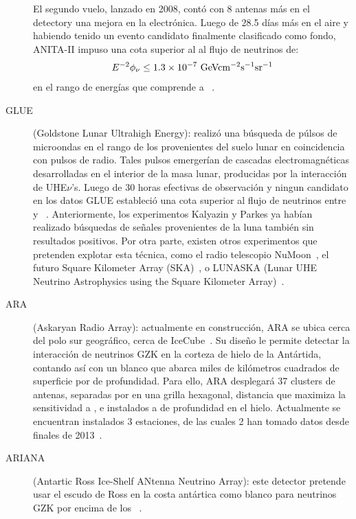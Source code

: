 \begin{description}
	 El segundo vuelo, lanzado en 2008, cont\'o con 8 antenas m\'as en el detectory una mejora en la electr\'onica.
	 Luego de 28.5 d\'ias m\'as en el aire y habiendo tenido un evento candidato finalmente clasificado como fondo, ANITA-II impuso una cota superior al  al flujo de neutrinos de:
	 \begin{equation}
	 E^{-2}\phi_\nu \leq 1.3\times10^{-7}{\rm\ GeVcm^{-2}s^{-1}sr^{-1}}
	 \end{equation}
	 en el rango de energ\'ias que comprende  a ~\cite{cite:Anita2}.
	 \item[GLUE] (Goldstone Lunar Ultrahigh Energy): realiz\'o una b\'usqueda de p\'ulsos de microondas en el rango de los  provenientes del suelo lunar en coincidencia con pulsos de radio. 
	 Tales pulsos emerger\'ian de cascadas electromagn\'eticas desarrolladas en el interior de la masa lunar, producidas por la interacci\'on de UHE$\nu$'s. 
	 Luego de 30 horas efectivas de observaci\'on y ningun candidato en los datos GLUE estableci\'o una cota superior al flujo de neutrinos entre  y ~\cite{cite:Glue}.
	 Anteriormente, los experimentos Kalyazin \cite{cite:Kalazin} y Parkes \cite{cite:Parkes} ya hab\'ian realizado b\'usquedas de se\~nales provenientes de la luna tambi\'en sin resultados positivos.
	 Por otra parte, existen otros experimentos que pretenden explotar esta t\'ecnica, como el radio telescopio NuMoon~\cite{cite:NuMoon}, el futuro Square Kilometer Array (SKA)~\cite{cite:SKA}, o LUNASKA (Lunar UHE Neutrino Astrophysics using the Square Kilometer Array)~\cite{cite:LUNASKA}.
	 \item[ARA] (Askaryan Radio Array): actualmente en construcci\'on, ARA se ubica cerca del polo sur geogr\'afico, cerca de IceCube~\cite{cite:ARA}.
	 Su dise\~no le permite detectar la interacci\'on de neutrinos GZK en la corteza de hielo de la Ant\'artida, contando as\'i con un blanco que abarca miles de kil\'ometros cuadrados de superficie por  de profundidad.
	 Para ello, ARA desplegar\'a 37 clusters de antenas, separadas por  en una grilla hexagonal, distancia que maximiza la sensitividad a , e instalados a  de profundidad en el hielo.
	 Actualmente se encuentran instalados 3 estaciones, de las cuales 2 han tomado datos desde finales de 2013~\cite{cite:ARA2}.
	 \item[ARIANA] (Antartic Ross Ice-Shelf ANtenna Neutrino Array): este detector pretende usar el escudo de Ross en la costa ant\'artica como blanco para neutrinos GZK por encima de los ~\cite{cite:ARIANNA}.

\end{description}
